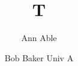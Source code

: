\documentclass{revtex4-2}
\let\affiliations\relax
\begin{document}
\title{T}
\author{Ann Able}
\author{Bob Baker \affiliations Univ A}
\maketitle
\end{document}
